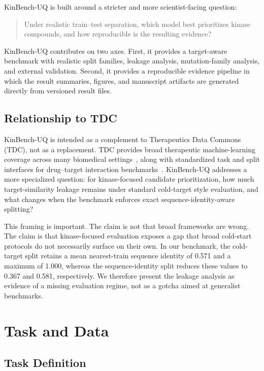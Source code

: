 \documentclass[11pt]{article}
\begin{document}
KinBench-UQ is built around a stricter and more scientist-facing question:

\begin{quote}
Under realistic train--test separation, which model best prioritizes kinase
compounds, and how reproducible is the resulting evidence?
\end{quote}

KinBench-UQ contributes on two axes. First, it provides a target-aware
benchmark with realistic split families, leakage analysis, mutation-family
analysis, and external validation. Second, it provides a reproducible evidence
pipeline in which the result summaries, figures, and manuscript artifacts are
generated directly from versioned result files.

\subsection{Relationship to TDC}

KinBench-UQ is intended as a complement to Therapeutics Data Commons (TDC),
not as a replacement. TDC provides broad therapeutic machine-learning coverage
across many biomedical settings~\cite{tdc_paper,tdc_site}, along with
standardized task and split interfaces for drug--target interaction
benchmarks~\cite{tdc_splits,tdc_dti}. KinBench-UQ addresses a more specialized
question: for kinase-focused candidate prioritization, how much
target-similarity leakage remains under standard cold-target style evaluation,
and what changes when the benchmark enforces exact sequence-identity-aware
splitting?

This framing is important. The claim is not that broad frameworks are wrong.
The claim is that kinase-focused evaluation exposes a gap that broad cold-start
protocols do not necessarily surface on their own. In our benchmark,
the cold-target split retains a mean nearest-train sequence identity of 0.571
and a maximum of 1.000, whereas the sequence-identity split reduces these
values to 0.367 and 0.581, respectively. We therefore present the leakage
analysis as evidence of a missing evaluation regime, not as a gotcha aimed at
generalist benchmarks.

\section{Task and Data}

\subsection{Task Definition}
\end{document}
